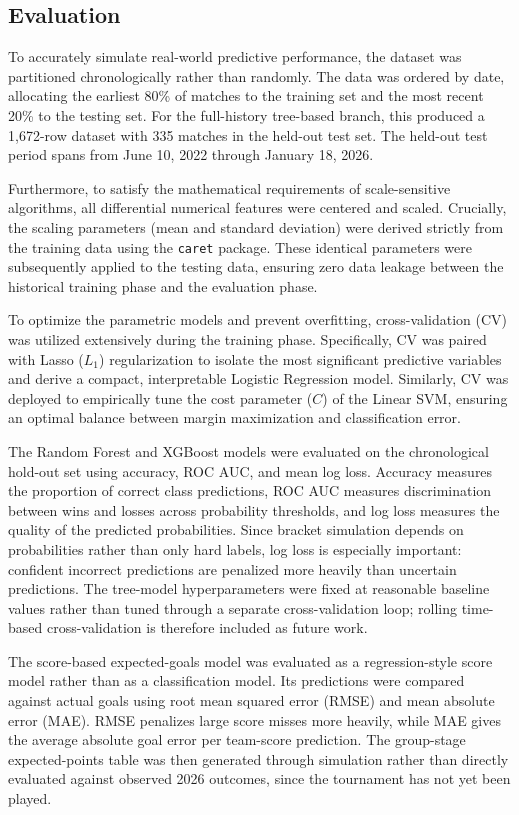 \documentclass[11pt]{article}
\begin{document}
\subsection{Evaluation}

To accurately simulate real-world predictive performance, the dataset was partitioned chronologically rather than randomly. The data was ordered by date, allocating the earliest 80\% of matches to the training set and the most recent 20\% to the testing set. For the full-history tree-based branch, this produced a 1,672-row dataset with 335 matches in the held-out test set. The held-out test period spans from June 10, 2022 through January 18, 2026.

Furthermore, to satisfy the mathematical requirements of scale-sensitive algorithms, all differential numerical features were centered and scaled. Crucially, the scaling parameters (mean and standard deviation) were derived strictly from the training data using the \texttt{caret} package. These identical parameters were subsequently applied to the testing data, ensuring zero data leakage between the historical training phase and the evaluation phase.

To optimize the parametric models and prevent overfitting, cross-validation (CV) was utilized extensively during the training phase. Specifically, CV was paired with Lasso ($L_1$) regularization to isolate the most significant predictive variables and derive a compact, interpretable Logistic Regression model. Similarly, CV was deployed to empirically tune the cost parameter ($C$) of the Linear SVM, ensuring an optimal balance between margin maximization and classification error.

The Random Forest and XGBoost models were evaluated on the chronological hold-out set using accuracy, ROC AUC, and mean log loss. Accuracy measures the proportion of correct class predictions, ROC AUC measures discrimination between wins and losses across probability thresholds, and log loss measures the quality of the predicted probabilities. Since bracket simulation depends on probabilities rather than only hard labels, log loss is especially important: confident incorrect predictions are penalized more heavily than uncertain predictions. The tree-model hyperparameters were fixed at reasonable baseline values rather than tuned through a separate cross-validation loop; rolling time-based cross-validation is therefore included as future work.

The score-based expected-goals model was evaluated as a regression-style score model rather than as a classification model. Its predictions were compared against actual goals using root mean squared error (RMSE) and mean absolute error (MAE). RMSE penalizes large score misses more heavily, while MAE gives the average absolute goal error per team-score prediction. The group-stage expected-points table was then generated through simulation rather than directly evaluated against observed 2026 outcomes, since the tournament has not yet been played.
\end{document}
